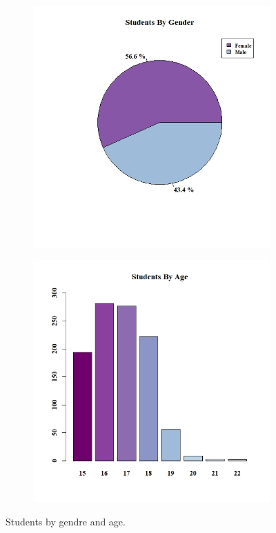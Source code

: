 \documentclass[a4paper, 11pt]{article}
\begin{document}
	\begin{figure}[h!]
		\centering
		\begin{subfigure}[b]{0.4\linewidth}
			\hspace*{-1.0in}
			\includegraphics[width=1.5\linewidth]{gender.jpeg}
		\end{subfigure}
		\begin{subfigure}[b]{0.4\linewidth}
			\includegraphics[width=1.5\linewidth]{age.jpeg}
		\end{subfigure}
		\caption*{Students by gendre and age.}
		\label{fig:gender_age}
	\end{figure}
	
\end{document}
